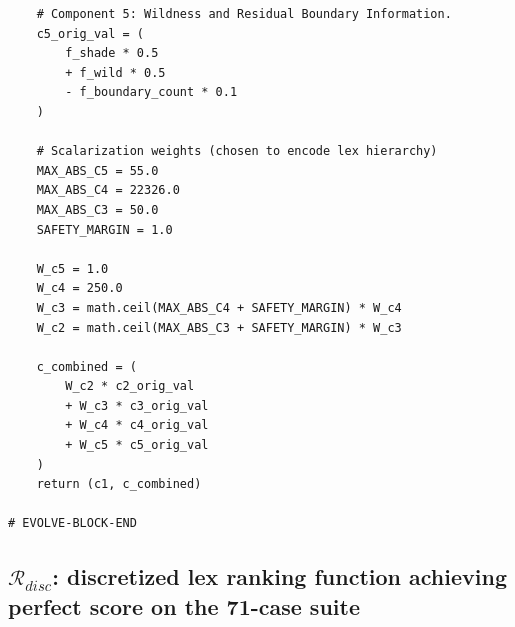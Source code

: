 \documentclass[11pt]{amsart}
\begin{document}
\begin{verbatim}
    # Component 5: Wildness and Residual Boundary Information.
    c5_orig_val = (
        f_shade * 0.5
        + f_wild * 0.5
        - f_boundary_count * 0.1
    )

    # Scalarization weights (chosen to encode lex hierarchy)
    MAX_ABS_C5 = 55.0
    MAX_ABS_C4 = 22326.0
    MAX_ABS_C3 = 50.0
    SAFETY_MARGIN = 1.0

    W_c5 = 1.0
    W_c4 = 250.0
    W_c3 = math.ceil(MAX_ABS_C4 + SAFETY_MARGIN) * W_c4
    W_c2 = math.ceil(MAX_ABS_C3 + SAFETY_MARGIN) * W_c3

    c_combined = (
        W_c2 * c2_orig_val
        + W_c3 * c3_orig_val
        + W_c4 * c4_orig_val
        + W_c5 * c5_orig_val
    )
    return (c1, c_combined)

# EVOLVE-BLOCK-END
\end{verbatim}

\subsection{$\mathcal{R}_{disc}$: discretized lex ranking function achieving perfect score on the 71-case suite}
\end{document}
